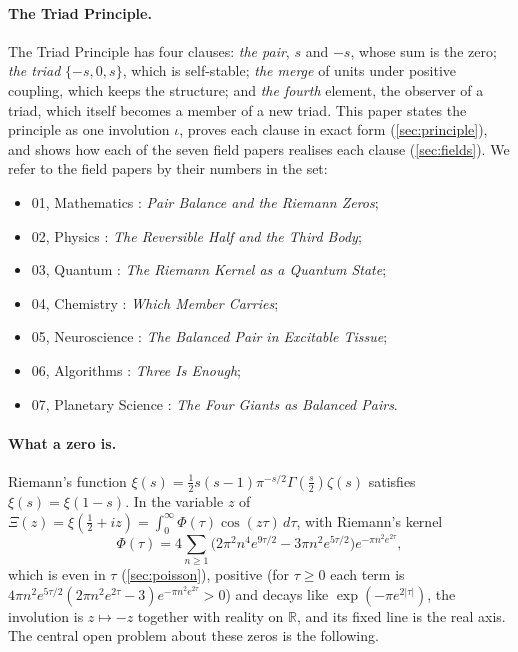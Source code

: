 \documentclass[11pt]{article}
\theoremstyle{definition}\newtheorem{definition}[theorem]{Definition}
\theoremstyle{remark}\newtheorem{remark}[theorem]{Remark}
\newcommand{\R}{\mathbb R}\newcommand{\C}{\mathbb C}\newcommand{\N}{\mathbb N}
\begin{document}
\paragraph{The Triad Principle.} The Triad Principle has four clauses: \emph{the pair}, $s$ and $-s$, whose sum is the zero; \emph{the triad} $\{-s,0,s\}$, which is self-stable; \emph{the merge} of units under positive coupling, which keeps the structure; and \emph{the fourth} element, the observer of a triad, which itself becomes a member of a new triad. This paper states the principle as one involution $\iota$, proves each clause in exact form (\cref{sec:principle}), and shows how each of the seven field papers \cite{SMath,SPhys,SQuant,SChem,SNeuro,SAlg,SPlanet} realises each clause (\cref{sec:fields}). We refer to the field papers by their numbers in the set:
\begin{itemize}
\item 01, Mathematics \cite{SMath}: \emph{Pair Balance and the Riemann Zeros};
\item 02, Physics \cite{SPhys}: \emph{The Reversible Half and the Third Body};
\item 03, Quantum \cite{SQuant}: \emph{The Riemann Kernel as a Quantum State};
\item 04, Chemistry \cite{SChem}: \emph{Which Member Carries};
\item 05, Neuroscience \cite{SNeuro}: \emph{The Balanced Pair in Excitable Tissue};
\item 06, Algorithms \cite{SAlg}: \emph{Three Is Enough};
\item 07, Planetary Science \cite{SPlanet}: \emph{The Four Giants as Balanced Pairs}.
\end{itemize}

\paragraph{What a zero is.} Riemann's function $\xi(s)=\frac12s(s-1)\pi^{-s/2}\Gamma(\frac s2)\zeta(s)$ satisfies $\xi(s)=\xi(1-s)$. In the variable $z$ of $\Xi(z)=\xi(\frac12+iz)=\int_0^\infty\Phi(\tau)\cos(z\tau)\,d\tau$, with Riemann's kernel
\[
\Phi(\tau)=4\sum_{n\ge1}\bigl(2\pi^2n^4e^{9\tau/2}-3\pi n^2e^{5\tau/2}\bigr)e^{-\pi n^2e^{2\tau}},
\]
which is even in $\tau$ (\cref{sec:poisson}), positive (for $\tau\ge0$ each term is $4\pi n^2e^{5\tau/2}(2\pi n^2e^{2\tau}-3)e^{-\pi n^2e^{2\tau}}>0$) and decays like $\exp(-\pi e^{2|\tau|})$, the involution is $z\mapsto-z$ together with reality on $\R$, and its fixed line is the real axis. The central open problem about these zeros is the following.
\end{document}
